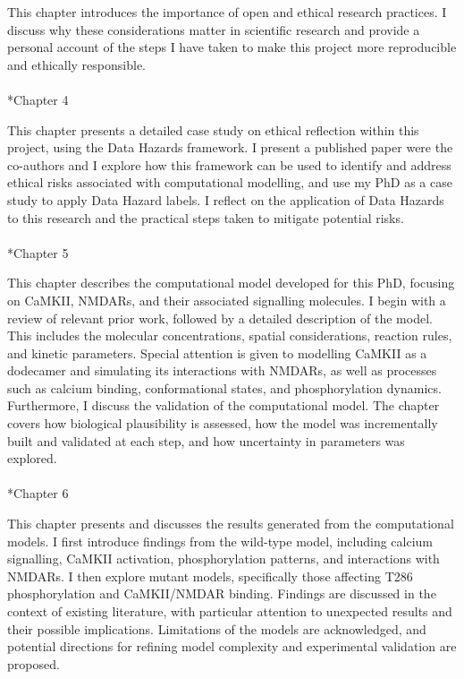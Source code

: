 \documentclass[
  11pt,
  letterpaper,
]{scrreprt}
\makeatletter
\let\oldparagraph\paragraph
\renewcommand{\paragraph}{
    \@ifstar
      \xxxParagraphStar
      \xxxParagraphNoStar
  }
\newcommand{\xxxParagraphStar}[1]{\oldparagraph*{#1}\mbox{}}
\newcommand{\xxxParagraphNoStar}[1]{\oldparagraph{#1}\mbox{}}
\makeatother
\begin{document}
This chapter introduces the importance of open and ethical research
practices. I discuss why these considerations matter in scientific
research and provide a personal account of the steps I have taken to
make this project more reproducible and ethically responsible.

\paragraph*{Chapter 4}\label{chapter-4}

This chapter presents a detailed case study on ethical reflection within
this project, using the Data Hazards framework. I present a published
paper were the co-authors and I explore how this framework can be used
to identify and address ethical risks associated with computational
modelling, and use my PhD as a case study to apply Data Hazard labels. I
reflect on the application of Data Hazards to this research and the
practical steps taken to mitigate potential risks.

\paragraph*{Chapter 5}\label{chapter-5}

This chapter describes the computational model developed for this PhD,
focusing on CaMKII, NMDARs, and their associated signalling molecules. I
begin with a review of relevant prior work, followed by a detailed
description of the model. This includes the molecular concentrations,
spatial considerations, reaction rules, and kinetic parameters. Special
attention is given to modelling CaMKII as a dodecamer and simulating its
interactions with NMDARs, as well as processes such as calcium binding,
conformational states, and phosphorylation dynamics. Furthermore, I
discuss the validation of the computational model. The chapter covers
how biological plausibility is assessed, how the model was incrementally
built and validated at each step, and how uncertainty in parameters was
explored.

\paragraph*{Chapter 6}\label{chapter-6}

This chapter presents and discusses the results generated from the
computational models. I first introduce findings from the wild-type
model, including calcium signalling, CaMKII activation, phosphorylation
patterns, and interactions with NMDARs. I then explore mutant models,
specifically those affecting T286 phosphorylation and CaMKII/NMDAR
binding. Findings are discussed in the context of existing literature,
with particular attention to unexpected results and their possible
implications. Limitations of the models are acknowledged, and potential
directions for refining model complexity and experimental validation are
proposed.
\end{document}
